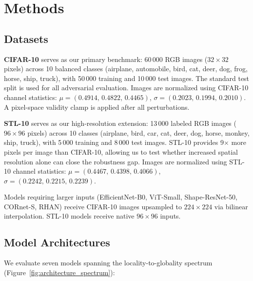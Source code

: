 \documentclass[12pt,a4paper]{article}
\begin{document}
\section{Methods}
\label{sec:methods}

\subsection{Datasets}

\textbf{CIFAR-10} \citep{krizhevsky2009learning} serves as our primary
benchmark: 60\,000 RGB images ($32{\times}32$ pixels) across 10 balanced
classes (airplane, automobile, bird, cat, deer, dog, frog, horse, ship,
truck), with 50\,000 training and 10\,000 test images. The standard test
split is used for all adversarial evaluation. Images are normalized using
CIFAR-10 channel statistics:
$\mu{=}(0.4914,\,0.4822,\,0.4465)$,
$\sigma{=}(0.2023,\,0.1994,\,0.2010)$.
A pixel-space validity clamp is applied after all perturbations.

\textbf{STL-10} serves as our high-resolution extension: 13\,000 labeled
RGB images ($96{\times}96$ pixels) across 10 classes (airplane, bird,
car, cat, deer, dog, horse, monkey, ship, truck), with 5\,000 training
and 8\,000 test images. STL-10 provides 9$\times$ more pixels per image
than CIFAR-10, allowing us to test whether increased spatial resolution
alone can close the robustness gap. Images are normalized using STL-10
channel statistics:
$\mu{=}(0.4467,\,0.4398,\,0.4066)$,
$\sigma{=}(0.2242,\,0.2215,\,0.2239)$.

Models requiring larger inputs (EfficientNet-B0, ViT-Small,
Shape-ResNet-50, CORnet-S, RHAN) receive CIFAR-10 images upsampled to
$224{\times}224$ via bilinear interpolation. STL-10 models receive
native $96{\times}96$ inputs.

\subsection{Model Architectures}

We evaluate seven models spanning the locality-to-globality spectrum
(Figure~\ref{fig:architecture_spectrum}):
\end{document}
